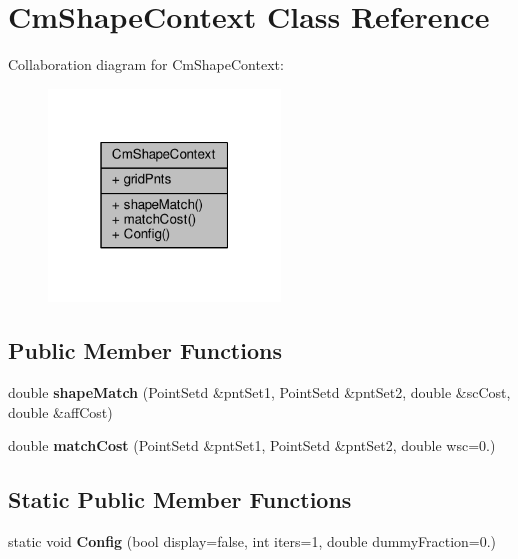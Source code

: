 \hypertarget{class_cm_shape_context}{}\section{Cm\+Shape\+Context Class Reference}
\label{class_cm_shape_context}


Collaboration diagram for Cm\+Shape\+Context\+:\nopagebreak
\begin{figure}[H]
\begin{center}
\leavevmode
\includegraphics[width=175pt]{class_cm_shape_context__coll__graph}
\end{center}
\end{figure}
\subsection*{Public Member Functions}
\begin{DoxyCompactItemize}
\item 
double {\bfseries shape\+Match} (Point\+Setd \&pnt\+Set1, Point\+Setd \&pnt\+Set2, double \&sc\+Cost, double \&aff\+Cost)\hypertarget{class_cm_shape_context_a27acc09496f499ba714176074259f475}{}\label{class_cm_shape_context_a27acc09496f499ba714176074259f475}

\item 
double {\bfseries match\+Cost} (Point\+Setd \&pnt\+Set1, Point\+Setd \&pnt\+Set2, double wsc=0.)\hypertarget{class_cm_shape_context_aa45ed20b3c9389de2d0d8cb0b1db3eab}{}\label{class_cm_shape_context_aa45ed20b3c9389de2d0d8cb0b1db3eab}

\end{DoxyCompactItemize}
\subsection*{Static Public Member Functions}
\begin{DoxyCompactItemize}
\item 
static void {\bfseries Config} (bool display=false, int iters=1, double dummy\+Fraction=0.)\hypertarget{class_cm_shape_context_a5f77b1ed0749126d4d287941b00e5ef6}{}\label{class_cm_shape_context_a5f77b1ed0749126d4d287941b00e5ef6}

\end{DoxyCompactItemize}
